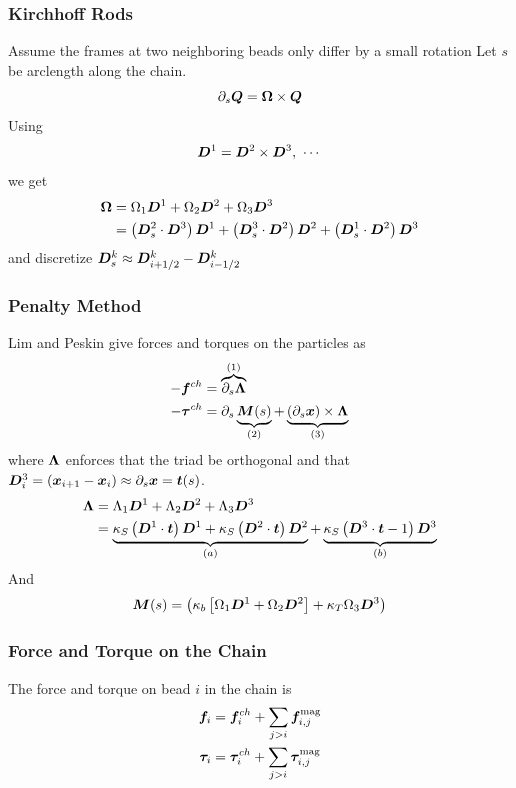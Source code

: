 \documentclass{beamer}
\begin{document}
\begin{frame}
\frametitle{Kirchhoff Rods}
\begin{alertblock}{Assume the frames at two neighboring beads only differ by a small rotation}
Let $s$ be arclength along the chain.
\[
\partial_{s} \boldsymbol{Q} = \boldsymbol{\Omega} \times \boldsymbol{Q}
\]
Using \[\V{D}^{1} = \V{D}^{2} \times \V{D}^{3}, \ \cdots\] we get
\begin{align}
\boldsymbol{\Omega} &=  \Omega_1 \boldsymbol{D}^{1} +  \Omega_2 \boldsymbol{D}^{2} +  \Omega_3 \boldsymbol{D}^{3} \\ 
&= \left( \boldsymbol{D}^{2}_{s} \cdot \boldsymbol{D}^{3} \right) \boldsymbol{D}^{1} +  \left( \boldsymbol{D}^{3}_{s} \cdot \boldsymbol{D}^{2} \right) \boldsymbol{D}^{2} +  \left( \boldsymbol{D}^{1}_{s} \cdot \boldsymbol{D}^{2} \right) \boldsymbol{D}^{3}
\end{align}
and discretize $\boldsymbol{D}^{k}_{s} \approx \boldsymbol{D}^{k}_{i+1/2} - \boldsymbol{D}^{k}_{i-1/2}$
\end{alertblock}
\end{frame}


\begin{frame}
\frametitle{Penalty Method}
Lim and Peskin give forces and torques on the particles as
\alert<1->{
\begin{align}
- \boldsymbol{f}^{ch} &= \overbrace{\partial_{s} \boldsymbol{\Lambda}}^{(1)} \\
- \boldsymbol{\tau}^{ch} &= \partial_{s} \underbrace{\boldsymbol{M}(s)}_{(2)} + \underbrace{\left( \partial_{s} \boldsymbol{x} \right) \times \boldsymbol{\Lambda}}_{(3)}
\end{align}
}
where $\boldsymbol{\Lambda}$ enforces that the triad be orthogonal and that $\boldsymbol{D}^{3}_i = \left( \boldsymbol{x}_{i+1} - \boldsymbol{x}_{i} \right) \approx \partial_{s} \boldsymbol{x} = \boldsymbol{t}(s)$.
\begin{align}
 \boldsymbol{\Lambda} &= \Lambda_1 \boldsymbol{D}^{1} +  \Lambda_2 \boldsymbol{D}^{2} +  \Lambda_3 \boldsymbol{D}^{3} \\
 &= \underbrace{\kappa_S \left( \boldsymbol{D}^{1} \cdot \boldsymbol{t} \right) \boldsymbol{D}^{1} +  \kappa_S \left( \boldsymbol{D}^{2} \cdot \boldsymbol{t} \right) \boldsymbol{D}^{2}}_{(a)} +  \underbrace{\kappa_S \left( \boldsymbol{D}^{3} \cdot \boldsymbol{t} -1 \right) \boldsymbol{D}^{3}}_{(b)}
\end{align}
And
\[
\boldsymbol{M}(s) = \left( \kappa_b \left[\Omega_1 \boldsymbol{D}^{1} +  \Omega_2 \boldsymbol{D}^{2} \right] +  \kappa_T \Omega_3 \boldsymbol{D}^{3} \right)
\]
 
\end{frame}

\begin{frame}
\frametitle{Force and Torque on the Chain}
The force and torque on bead $i$ in the chain is 
\begin{align}
\boldsymbol{f}_{i} &= \boldsymbol{f}_{i}^{ch} + \displaystyle \sum_{j > i} \boldsymbol{f}^{\text{mag}}_{i,j} \\
\boldsymbol{\tau}_{i} &= \boldsymbol{\tau}_{i}^{ch} + \displaystyle \sum_{j > i} \boldsymbol{\tau}^{\text{mag}}_{i,j}
\end{align}
 
\end{frame}
\end{document}
